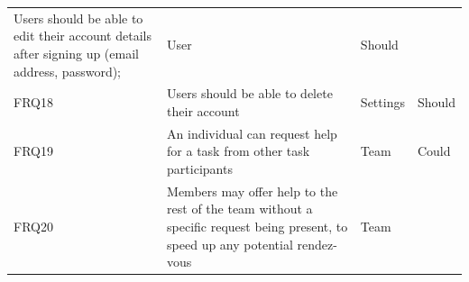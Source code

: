 \begin{longtable}[]{@{}llll@{}}
\begin{minipage}[t]{0.64\columnwidth}
Users should be able to edit their account details after signing up
(email address, password);\strut
\end{minipage} & \begin{minipage}[t]{0.12\columnwidth}\raggedright\strut
User\strut
\end{minipage} & \begin{minipage}[t]{0.09\columnwidth}\raggedright\strut
Should\strut
\end{minipage}\tabularnewline
\begin{minipage}[t]{0.04\columnwidth}\raggedright\strut
FRQ18\strut
\end{minipage} & \begin{minipage}[t]{0.64\columnwidth}\raggedright\strut
Users should be able to delete their account\strut
\end{minipage} & \begin{minipage}[t]{0.12\columnwidth}\raggedright\strut
Settings\strut
\end{minipage} & \begin{minipage}[t]{0.09\columnwidth}\raggedright\strut
Should\strut
\end{minipage}\tabularnewline
\begin{minipage}[t]{0.04\columnwidth}\raggedright\strut
FRQ19\strut
\end{minipage} & \begin{minipage}[t]{0.64\columnwidth}\raggedright\strut
An individual can request help for a task from other task
participants\strut
\end{minipage} & \begin{minipage}[t]{0.12\columnwidth}\raggedright\strut
Team\strut
\end{minipage} & \begin{minipage}[t]{0.09\columnwidth}\raggedright\strut
Could\strut
\end{minipage}\tabularnewline
\begin{minipage}[t]{0.04\columnwidth}\raggedright\strut
FRQ20\strut
\end{minipage} & \begin{minipage}[t]{0.64\columnwidth}\raggedright\strut
Members may offer help to the rest of the team without a specific
request being present, to speed up any potential rendez-vous\strut
\end{minipage} & \begin{minipage}[t]{0.12\columnwidth}\raggedright\strut
Team\strut
\end{minipage} & \begin{minipage}[t]{0.09\columnwidth}\raggedright\strut

\end{minipage}
\end{longtable}
